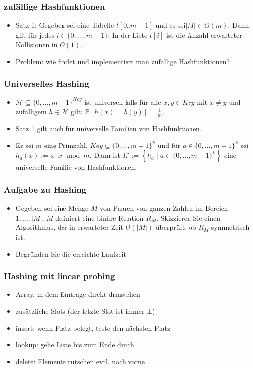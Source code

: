 \begin{frame}
\frametitle{zufällige Hashfunktionen}
\begin{itemize}
\item Satz 1: Gegeben sei eine Tabelle $t[0..m-1]$ und es sei$|M|\in O(m)$. Dann gilt für jedes $i\in \{0,\ldots,m-1\}$: In der Liste $t[i]$ ist die Anzahl erwarteter Kollisionen in $O(1)$.\pause
\item Problem: wie findet und implementiert man zufällige Hashfunktionen?
\end{itemize}
\end{frame}

\begin{frame}
\frametitle{Universelles Hashing}
\begin{itemize}
\item $\mathcal{H}\subseteq \{0,\ldots,m-1\}^{Key}$ ist universell falls für alle $x, y\in Key$ mit $x\neq y$ und zufälligem $h\in\mathcal{H}$ gilt: $\mathbb{P}[h(x)=h(y)]=\frac{1}{m}$.\pause
\item Satz 1 gilt auch für universelle Familien von Hashfunktionen.\pause
\item Es sei $m$ eine Primzahl, $Key\subseteq \{0,\ldots,m-1\}^k$ und für $a\in \{0,\ldots,m-1\}^k$ sei $h_a(x):=a\cdot x \mod m$. Dann ist $H^\cdot:=\left\lbrace h_a \mid a\in \{0,\ldots,m-1\}^k\right\rbrace$ eine universelle Familie von Hashfunktionen.
\end{itemize}
\end{frame}

\begin{frame}
\frametitle{Aufgabe zu Hashing}
\begin{itemize}
\item Gegeben sei eine Menge $M$ von Paaren von ganzen Zahlen im Bereich $1,\ldots,|M|$. $M$ definiert eine binäre Relation $R_M$. Skizzieren Sie einen Algorithmus, der in erwarteter Zeit $O(|M|)$ überprüft, ob $R_M$ symmetrisch ist.
\item Begründen Sie die erreichte Laufzeit.
\end{itemize}
\end{frame}

\begin{frame}
\frametitle{Hashing mit linear probing}
\begin{itemize}
\item Array, in dem Einträge direkt drinstehen
\item zusätzliche Slots (der letzte Slot ist immer $\bot$)\pause
\item insert: wenn Platz belegt, teste den nächsten Platz
\item lookup: gehe Liste bis zum Ende durch
\item delete: Elemente rutschen evtl. nach vorne
\end{itemize}
\end{frame}

